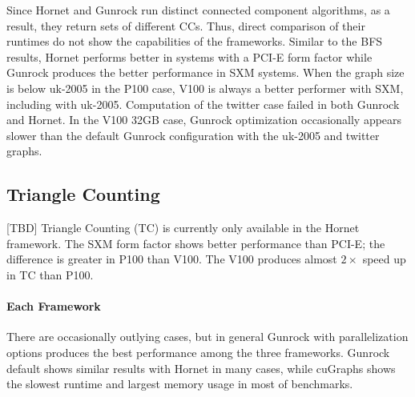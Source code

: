 Since Hornet and Gunrock run distinct connected component algorithms, as a result, they return sets of different CCs. Thus, direct comparison of their runtimes do not show the capabilities of the frameworks. Similar to the BFS results, Hornet performs better in systems with a PCI-E form factor while Gunrock produces the better performance in SXM systems. When the graph size is below uk-2005 in the P100 case, V100 is always a better performer with SXM, including with uk-2005. Computation of the twitter case failed in both Gunrock and Hornet. In the V100 32GB case, Gunrock optimization occasionally appears slower than the default Gunrock configuration with the uk-2005 and twitter graphs.




\subsection{Triangle Counting}

[TBD] Triangle Counting (TC) is currently only available in the Hornet framework. The SXM form factor shows better performance than PCI-E; the difference is greater in P100 than V100. The V100 produces almost $2\times$ speed up in TC than P100.


\paragraph{Each Framework}
There are occasionally outlying cases, but in general Gunrock with parallelization options produces the best performance among the three frameworks. Gunrock default shows similar results with Hornet in many cases, while cuGraphs shows the slowest runtime and largest memory usage in most of benchmarks.

